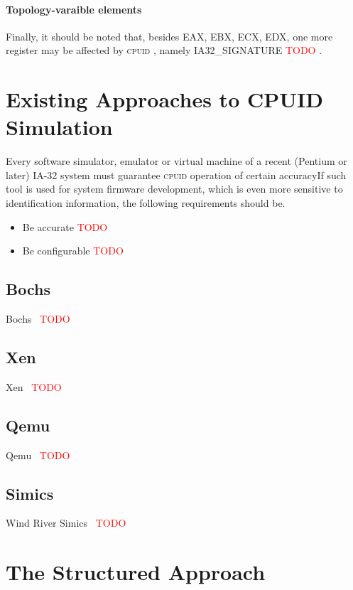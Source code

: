 \documentclass[a4paper,10pt,oneside,unicode]{article}
\newcommand{\cpuid}{\textsc{cpuid} }
\newcommand{\todo}[1][]{\textcolor{red}{TODO #1}}
\begin{document}
\paragraph{Topology-varaible elements}

Finally, it should be noted that, besides EAX, EBX, ECX, EDX, one more register may be affected by \cpuid, namely IA32\_SIGNATURE \todo.

\section{Existing Approaches to CPUID Simulation}

Every software simulator, emulator or virtual machine of a recent (Pentium or later) IA-32 system must guarantee \cpuid operation of certain accuracyIf such tool is used for system firmware development, which is even more sensitive to identification information, the following requirements should be.
\begin{itemize}
\item Be accurate \todo
\item Be configurable \todo
\end{itemize}

\subsection{Bochs}

Bochs~\cite{bochs} \todo 

\subsection{Xen}

Xen~\cite{xen2006} \todo 

\subsection{Qemu}

Qemu~\cite{qemu} \todo 

\subsection{Simics}

Wind River Simics~\cite{simics} \todo

\section{The Structured Approach}
\end{document}
